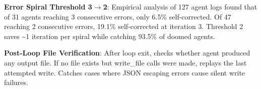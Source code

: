 \textbf{Error Spiral Threshold 3$\rightarrow$2}: Empirical analysis of 127 agent logs found that of 31 agents reaching 3 consecutive errors, only 6.5\% self-corrected. Of 47 reaching 2 consecutive errors, 19.1\% self-corrected at iteration 3. Threshold 2 saves \textasciitilde1 iteration per spiral while catching 93.5\% of doomed agents.

\textbf{Post-Loop File Verification}: After loop exit, checks whether agent produced any output file. If no file exists but write\_file calls were made, replays the last attempted write. Catches cases where JSON escaping errors cause silent write failures.

